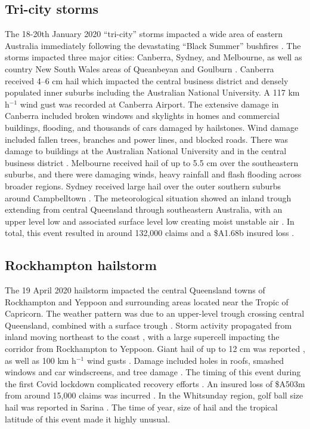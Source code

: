 \documentclass[draft,grl]{agutexSI2019}\usepackage[]{graphicx}\usepackage[]{xcolor}
\begin{document}
\begin{article}
\subsection*{Tri-city storms}

The 18-20th January 2020 ``tri-city'' storms impacted a wide area of eastern
Australia immediately following the devastating ``Black Summer'' bushfires
\cite<unless otherwise noted, details here are sourced from the>{AIDR_2020}. The
storms impacted three major cities: Canberra, Sydney, and Melbourne, as well as
country New South Wales areas of Queanbeyan and Goulburn \cite{ICA_2024}.
Canberra received 4--6 cm hail which impacted the central business district and
densely populated inner suburbs including the Australian National University. A
117 km h$^{-1}$ wind gust was recorded at Canberra Airport. The extensive damage
in Canberra included broken windows and skylights in homes and commercial
buildings, flooding, and thousands of cars damaged by hailstones. Wind damage
included fallen trees, branches and power lines, and blocked roads. There was
damage to buildings at the Australian National University and in the central
business district \cite{ABC_2020c}. Melbourne received hail of up to 5.5 cm over
the southeastern suburbs, and there were damaging winds, heavy rainfall and
flash flooding across broader regions. Sydney received large hail over the outer
southern suburbs around Campbelltown \cite{ABC_2020d}. The meteorological
situation showed an inland trough extending from central Queensland through
southeastern Australia, with an upper level low and associated surface level low
creating moist unstable air \cite{BOM_2024}. In total, this event resulted in
around 132,000 claims and a \$A1.68b insured loss \cite{ICA_2024}.

\subsection*{Rockhampton hailstorm}

The 19 April 2020 hailstorm \cite{ABC_2020, EWN_2020, Swissre_2021} impacted the
central Queensland towns of Rockhampton and Yeppoon and surrounding areas
\cite{ABC_2020} located near the Tropic of Capricorn. The weather pattern was
due to an upper-level trough crossing central Queensland, combined with a
surface trough \cite{EWN_2020}. Storm activity propagated from inland moving
northeast to the coast \cite{EWN_2020}, with a large supercell impacting the
corridor from Rockhampton to Yeppoon. Giant hail of up to 12 cm was reported
\cite{EWN_2020}, as well as 100 km h$^{-1}$ wind gusts \cite{ABC_2020}. Damage
included holes in roofs, smashed windows and car windscreens, and tree damage
\cite{ABC_2020}. The timing of this event during the first Covid lockdown
complicated recovery efforts \cite{AFR_2020}. An insured loss of \$A503m from
around 15,000 claims was incurred \cite{ICA_2024}. In the Whitsunday region,
golf ball size hail was reported in Sarina \cite{EWN_2020}. The time of year,
size of hail and the tropical latitude of this event made it highly unusual.


\end{article}
\end{document}
